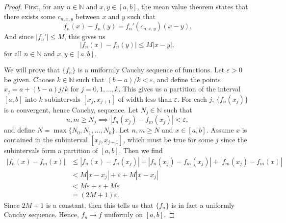 \documentclass[12pt]{article}
\theoremstyle{definition}
\newcommand{\N}{\mathbb{N}}
\newcommand{\eps}{\varepsilon}
\begin{document}
\begin{proof}
    First, for any $n \in \N$ and $x, y \in [a, b]$, the mean value theorem states that there exists some $c_{n,x,y}$ between $x$ and $y$ such that
    \[
        f_n(x) - f_n(y) = f_n'(c_{n,x,y})(x - y).
    \]
    And since $|f_n'| \leq M$, this gives us
    \[
        |f_n(x) - f_n(y)| \leq M|x - y|,
    \]
    for all $n \in \N$ and $x, y \in [a, b]$.
    
    We will prove that $\{f_n\}$ is a uniformly Cauchy sequence of functions. Let $\eps > 0$ be given. Choose $k \in \N$ such that $(b-a)/k < \eps$, and define the points $x_j = a + (b-a)j/k$ for $j = 0, 1, \dots, k$. This gives us a partition of the interval $[a, b]$ into $k$ subintervals $[x_j, x_{j+1}]$ of width less than $\eps$. For each $j$, $\{f_n(x_j)\}$ is a convergent, hence Cauchy, sequence. Let $N_j \in \N$ such that
    \[
        n, m \geq N_j \implies |f_n(x_j) - f_m(x_j)| < \eps,
    \]
    and define $N = \max\{N_0, N_1, \dots, N_k\}$. Let $n, m \geq N$ and $x \in [a, b]$. Assume $x$ is contained in the subinterval $[x_j, x_{j+1}]$, which must be true for some $j$ since the subintervals form a partition of $[a, b]$. Then we find
    \begin{align*}
        |f_n(x) - f_m(x)|
            &\leq |f_n(x) - f_n(x_j)| + |f_n(x_j) - f_m(x_j)| + |f_m(x_j) - f_m(x)| \\
            &< M|x - x_j| + \eps + M|x - x_j| \\
            &< M\eps + \eps + M\eps\\
            &= (2M + 1)\eps.
    \end{align*}
    Since $2M + 1$ is a constant, then this tells us that $\{f_n\}$ is in fact a uniformly Cauchy sequence. Hence, $f_n \to f$ uniformly on $[a, b]$.
    
\end{proof}
\end{document}
